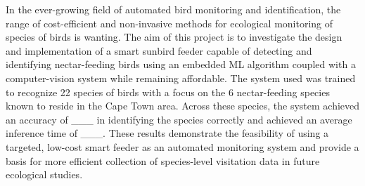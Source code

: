 {}


In the ever-growing field of automated bird monitoring and identification, the range of cost-efficient and non-invasive methods for ecological monitoring of species of birds is wanting. The aim of this project is to investigate the design and implementation of a smart sunbird feeder capable of detecting and identifying nectar-feeding birds using an embedded ML algorithm coupled with a computer-vision system while remaining affordable. The system used was trained to recognize 22 species of birds with a focus on the 6 nectar-feeding species known to reside in the Cape Town area. Across these species, the system achieved an accuracy of \_\_\_ in identifying the species correctly and achieved an average inference time of \_\_\_. These results demonstrate the feasibility of using a targeted, low-cost smart feeder as an automated monitoring system and provide a basis for more efficient collection of species-level visitation data in future ecological studies.

